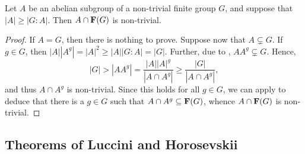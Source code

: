 \begin{corollary}
    Let $A$ be an abelian subgroup of a non-trivial finite group $G$, and suppose that $|A|\ge |G : A|$. Then $A\cap\mathbf{F}(G)$ is non-trivial.
\end{corollary}
\begin{proof}
    If $A = G$, then there is nothing to prove. Suppose now that $A\subsetneq G$. If $g\in G$, then $|A||A^g| = |A|^2\ge |A||G : A| = |G|$. Further, due to , $AA^g\subsetneq G$. Hence, 
    \begin{equation*}
        |G| > |AA^g| = \frac{|A||A|^g}{|A\cap A^g|}\ge\frac{|G|}{|A\cap A^g|},
    \end{equation*}
    and thus $A\cap A^g$ is non-trivial. Since this holds for all $g\in G$, we can apply  to deduce that there is a $g\in G$ such that $A\cap A^g\subseteq\mathbf{F}(G)$, whence $A\cap\mathbf{F}(G)$ is non-trivial.
\end{proof}

\subsection{Theorems of Luccini and Horosevskii}

